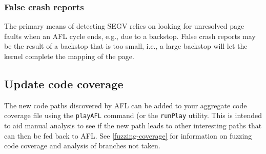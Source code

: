 \documentclass[titlepage]{article}
\begin{document}
\subsubsection{False crash reports}
The primary means of detecting SEGV relies on looking for unresolved page faults when an AFL cycle ends, e.g., due to a backstop.
False crash reports may be the result of a backstop that is too small, i.e., a large backstop will let the kernel complete the
mapping of the page.


\subsection{Update code coverage}
The new code paths discovered by AFL can be added to your aggregate code coverage file using the {\tt playAFL} command (or the {\tt runPlay} utility.  This is intended
to aid manual analysis to see if the new path leads to other interesting paths that can then be fed back to AFL.  
See \ref{fuzzing-coverage} for information on fuzzing code coverage and analysis of branches not taken.
\end{document}
